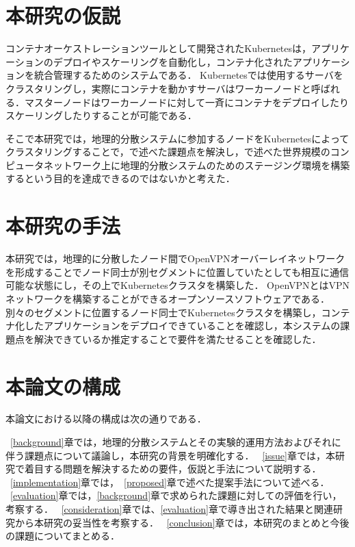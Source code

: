 \section{本研究の仮説}
\label{introduction:hypothesis}
コンテナオーケストレーションツールとして開発されたKubernetesは，アプリケーションのデプロイやスケーリングを自動化し，コンテナ化されたアプリケーションを統合管理するためのシステムである．
Kubernetesでは使用するサーバをクラスタリングし，実際にコンテナを動かすサーバはワーカーノードと呼ばれる．マスターノードはワーカーノードに対して一斉にコンテナをデプロイしたりスケーリングしたりすることが可能である．

そこで本研究では，地理的分散システムに参加するノードをKubernetesによってクラスタリングすることで，{}で述べた課題点を解決し，{}で述べた世界規模のコンピュータネットワーク上に地理的分散システムのためのステージング環境を構築するという目的を達成できるのではないかと考えた．

\section{本研究の手法}
\label{introduction:proposal}
本研究では，地理的に分散したノード間でOpenVPNオーバーレイネットワークを形成することでノード同士が別セグメントに位置していたとしても相互に通信可能な状態にし，その上でKubernetesクラスタを構築した．
OpenVPNとはVPNネットワークを構築することができるオープンソースソフトウェアである．
別々のセグメントに位置するノード同士でKubernetesクラスタを構築し，コンテナ化したアプリケーションをデプロイできていることを確認し，本システムの課題点を解決できているか推定することで要件を満たせることを確認した．


\section{本論文の構成}
\label{introduction:structure}
本論文における以降の構成は次の通りである．

~\ref{background}章では，地理的分散システムとその実験的運用方法およびそれに伴う課題点について議論し，本研究の背景を明確化する．
~\ref{issue}章では，本研究で着目する問題を解決するための要件，仮説と手法について説明する．
~\ref{implementation}章では，~\ref{proposed}章で述べた提案手法について述べる．
~\ref{evaluation}章では，\ref{background}章で求められた課題に対しての評価を行い，考察する．
~\ref{consideration}章では、\ref{evaluation}章で導き出された結果と関連研究から本研究の妥当性を考察する．
~\ref{conclusion}章では，本研究のまとめと今後の課題についてまとめる．


